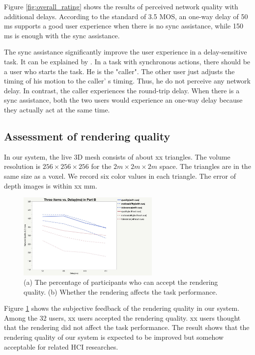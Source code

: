 Figure \ref{fig:overall_rating} shows the results of perceived network quality with additional delays. According to the standard of 3.5 MOS, an one-way delay of 50 ms supports a good user experience when there is no sync assistance, while 150 ms is enough with the sync assistance.

The sync assistance significantly improve the user experience in a delay-sensitive task. It can be explained by \cite{hashimoto2006influences}. In a task with synchronous actions, there should be a user who starts the task. He is the "caller". The other user just adjusts the timing of his motion to the caller' s timing. Thus, he do not perceive any network delay. In contrast, the caller experiences the round-trip delay. When there is a sync assistance, both the two users would experience an one-way delay because they actually act at the same time.

\subsection{Assessment of rendering quality}

In our system, the live 3D mesh consists of about xx triangles. The volume resolution is $256 \times 256 \times 256$ for the $2m \times 2m \times 2m$ space. The triangles are in the same size as a voxel. We record six color values in each triangle. The error of depth images is within xx mm.

\begin{figure}[!htbp]
\centering
\includegraphics[width=6.9cm]{figures/figure_experiment2.jpg}
\setlength{\abovecaptionskip}{0.5cm}
\caption{(a) The percentage of participants who can accept the rendering quality. (b) Whether the rendering affects the task performance.}
\label{fig:result_quality}
\end{figure}

Figure \ref{fig:result_quality} shows the subjective feedback of the rendering quality in our system. Among the 32 users, xx users accepted the rendering quality. xx users thought that the rendering did not affect the task performance. The result shows that the rendering quality of our system is expected to be improved but somehow acceptable for related HCI researches.

